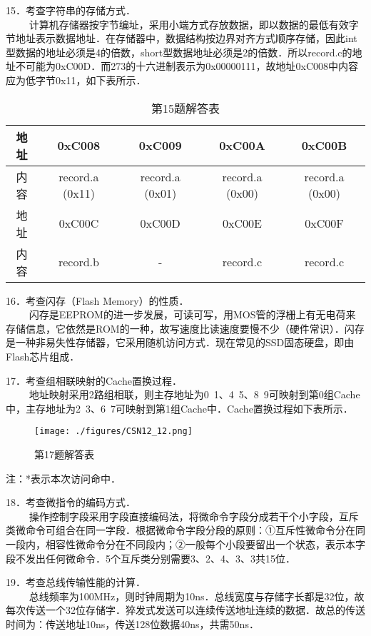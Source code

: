 15．考查字符串的存储方式．\\
$\qquad$ 计算机存储器按字节编址，采用小端方式存放数据，即以数据的最低有效字节地址表示数据地址．在存储器中，数据结构按边界对齐方式顺序存储，因此int型数据的地址必须是4的倍数，short型数据地址必须是2的倍数．所以record.c的地址不可能为0xC00D．而273的十六进制表示为0x00000111，故地址0xC008中内容应为低字节0x11，如下表所示．
\begin{table}[ht]
\centering
\caption{第15题解答表}\label{CSN12_tab6}
\begin{tabular}{|c|c|c|c|c|}
\hline
地址 & 0xC008 & 0xC009 & 0xC00A & 0xC00B \\
\hline
内容 & record.a (0x11) & record.a (0x01) & record.a (0x00) & record.a (0x00) \\
\hline
地址 & 0xC00C & 0xC00D & 0xC00E & 0xC00F \\
\hline
内容 & record.b & - & record.c & record.c \\
\hline
\end{tabular}
\end{table}

16．考查闪存（Flash Memory）的性质．\\
$\qquad$ 闪存是EEPROM的进一步发展，可读可写，用MOS管的浮栅上有无电荷来存储信息，它依然是ROM的一种，故写速度比读速度要慢不少（硬件常识）．闪存是一种非易失性存储器，它采用随机访问方式．现在常见的SSD固态硬盘，即由Flash芯片组成．

17．考查组相联映射的Cache置换过程．\\
$\qquad$ 地址映射采用2路组相联，则主存地址为0~1、4~5、8~9可映射到第0组Cache中，主存地址为2~3、6~7可映射到第1组Cache中．Cache置换过程如下表所示．
\begin{figure}[ht]
\centering
\texttt{[image: ./figures/CSN12\_12.png]}
\caption{第17题解答表} \label{CSN12_fig12}
\end{figure}
注：*表示本次访问命中．

18．考查微指令的编码方式．\\
$\qquad$ 操作控制字段采用字段直接编码法，将微命令字段分成若干个小字段，互斥类微命令可组合在同一字段．根据微命令字段分段的原则：①互斥性微命令分在同一段内，相容性微命令分在不同段内；②一般每个小段要留出一个状态，表示本字段不发出任何微命令．5个互斥类分别需要3、2、4、3、3共15位．

19．考查总线传输性能的计算．\\
$\qquad$ 总线频率为100MHz，则时钟周期为10ns．总线宽度与存储字长都是32位，故每次传送一个32位存储字．猝发式发送可以连续传送地址连续的数据．故总的传送时间为：传送地址10ns，传送128位数据40ns，共需50ns．

